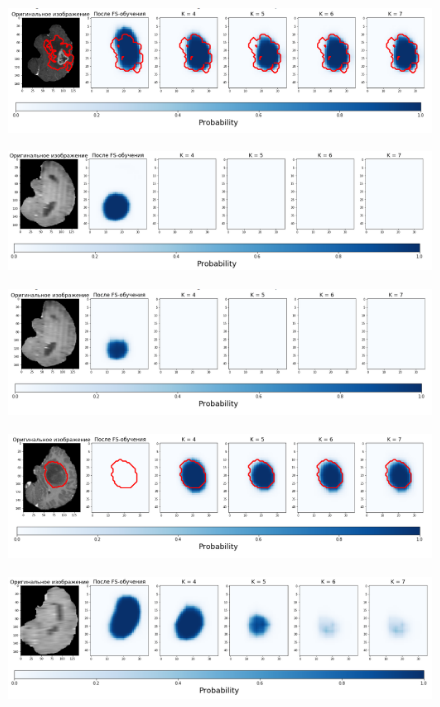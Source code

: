 \begin{figure}[h!] 
  \center
  \includegraphics [scale=0.7] {images/good_17.png}
 \end{figure} 
  
  \begin{figure}[h!] 
  \center
  \includegraphics [scale=0.7] {images/good_18.png}
  \end{figure} 
  
  \begin{figure}[h!] 
  \center
  \includegraphics [scale=0.7] {images/good_19.png}
\end{figure}


  \begin{figure}[h!] 
  \center
  \includegraphics [scale=0.7] {images/good_20.png}
\end{figure}

  \begin{figure}[h!] 
  \center
  \includegraphics [scale=0.7] {images/good_21.png}
  \end{figure} 
  



